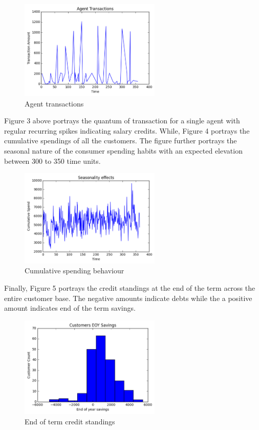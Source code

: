 \documentclass[]{article}
\begin{document}
\begin{figure}
\centering
\includegraphics[width=0.6\textwidth]{uploads/upload_8de0984822b859025b78852554b10186.png}
\caption{Agent transactions}
\end{figure}

Figure 3 above portrays the quantum of transaction for a single agent
with regular recurring spikes indicating salary credits. While, Figure 4
portrays the cumulative spendings of all the customers. The figure
further portrays the seasonal nature of the consumer spending habits
with an expected elevation between 300 to 350 time units.

\begin{figure}
\centering
\includegraphics[width=0.6\textwidth]{uploads/upload_5b7adbe2ae9cc4c0a41968d434fcb446.png}
\caption{Cumulative spending behaviour}
\end{figure}

Finally, Figure 5 portrays the credit standings at the end of the term
across the entire customer base. The negative amounts indicate debts
while the a positive amount indicates end of the term savings.

\begin{figure}
\centering
\includegraphics[width=0.6\textwidth]{uploads/upload_f1eb193470c68d9e7f241b3c1bb8c5e9.png}
\caption{End of term credit standings}
\end{figure}
\end{document}
